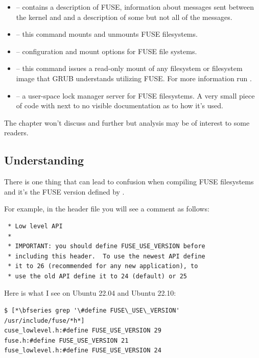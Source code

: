 \begin{itemize}
	\item {} -- contains a description of FUSE, information about messages sent between the kernel and 
		and a description of some but not all of the messages.
	\item {} -- this command mounts and unmounts FUSE filesystems.
	\item {} -- configuration and mount options for FUSE file systems.
	\item {} -- this command issues a read-only mount of any filesystem or filesystem image that 
		GRUB understands utilizing FUSE. For more information run .
	\item {} -- a user-space lock manager server for FUSE filesystems. A very small piece of code
		with next to no visible documentation as to how it's used. 
\end{itemize}

\noindent
The chapter won't discuss   and   further but analysis may be of interest to some readers.


\subsection{Understanding }

There is one thing that can lead to confusion when compiling FUSE filesystems and it's the FUSE version defined by .

For example, in the header file  you will see a comment as follows:

\begin{lstlisting}
 * Low level API
 *
 * IMPORTANT: you should define FUSE_USE_VERSION before 
 * including this header.  To use the newest API define 
 * it to 26 (recommended for any new application), to 
 * use the old API define it to 24 (default) or 25
\end{lstlisting}

\noindent
Here is what I see on Ubuntu 22.04 and Ubuntu 22.10:

\begin{lstlisting}
$ [*\bfseries grep '\#define FUSE\_USE\_VERSION' /usr/include/fuse/*h*]
cuse_lowlevel.h:#define FUSE_USE_VERSION 29
fuse.h:#define FUSE_USE_VERSION 21
fuse_lowlevel.h:#define FUSE_USE_VERSION 24
\end{lstlisting}

